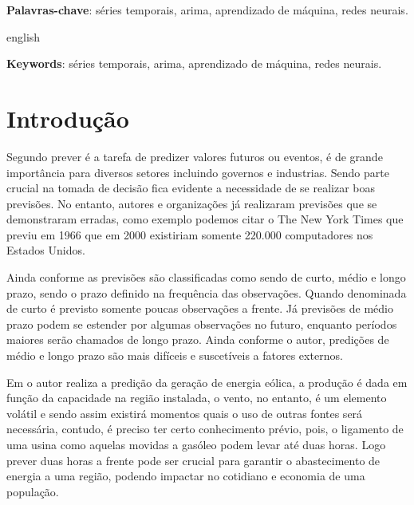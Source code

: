 \documentclass[
    12pt,
    oneside,
    a4paper,
    english,
    brazil
]{abntex2}
\begin{document}
\frenchspacing

\imprimircapa{}

\imprimirfolhaderosto{}

\begin{resumo}

    \textbf{Palavras-chave}: séries temporais, arima, aprendizado de máquina, 
    redes neurais.
\end{resumo}

\begin{resumo}[Abstract]
    \begin{otherlanguage*}{english}

        \textbf{Keywords}: séries temporais, arima, aprendizado de máquina, 
        redes neurais.
    \end{otherlanguage*}
\end{resumo}

\textual{}

\tableofcontents*
\cleardoublepage{}

\chapter{Introdução}

Segundo  prever é a tarefa de predizer valores futuros ou 
eventos, é de grande importância para diversos setores incluindo governos e 
industrias. Sendo parte crucial na tomada de decisão fica evidente a necessidade 
de se realizar boas previsões. No entanto, autores e organizações já realizaram 
previsões que se demonstraram erradas, como exemplo podemos citar o The New York 
Times que previu em 1966 que em 2000 existiriam somente 220.000 computadores nos 
Estados Unidos.

Ainda conforme  as previsões são classificadas como sendo de 
curto, médio e longo prazo, sendo o prazo definido na frequência das 
observações.  Quando denominada de curto é previsto somente poucas observações a 
frente. Já previsões de médio prazo podem se estender por algumas observações no 
futuro, enquanto períodos maiores serão chamados de longo prazo. Ainda conforme 
o autor, predições de médio e longo prazo são mais difíceis e suscetíveis a 
fatores externos.

Em  o autor realiza a predição da geração de energia 
eólica, a produção é dada em função da capacidade na região instalada, o vento, 
no entanto, é um elemento volátil e sendo assim existirá momentos quais o uso de 
outras fontes será necessária, contudo, é preciso ter certo conhecimento prévio, 
pois, o ligamento de uma usina como aquelas movidas a gasóleo podem levar até 
duas horas. Logo prever duas horas a frente pode ser crucial para garantir o 
abastecimento de energia a uma região, podendo impactar no cotidiano e economia 
de uma população.
\end{document}
